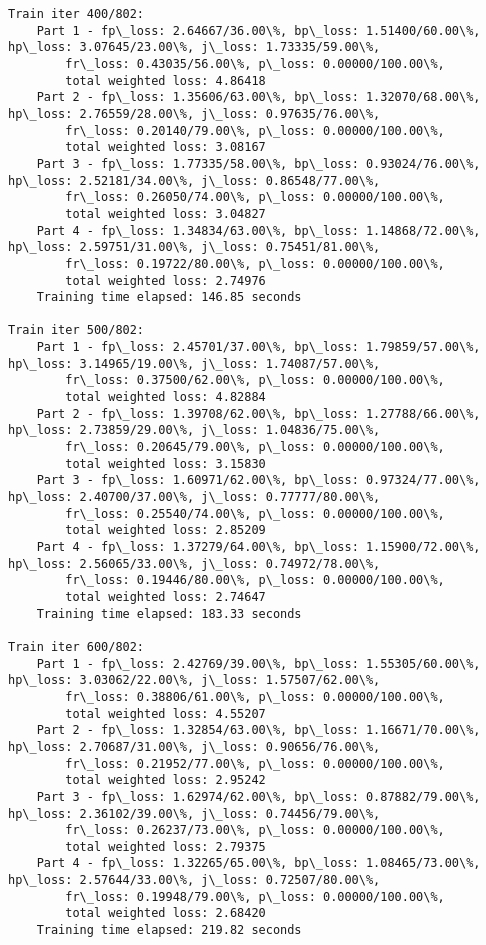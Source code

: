\documentclass[11pt]{article}
\begin{document}
\begin{Verbatim}[commandchars=\\\{\}]
Train iter 400/802:
	Part 1 - fp\_loss: 2.64667/36.00\%, bp\_loss: 1.51400/60.00\%, hp\_loss: 3.07645/23.00\%, j\_loss: 1.73335/59.00\%, 
		fr\_loss: 0.43035/56.00\%, p\_loss: 0.00000/100.00\%, 
		total weighted loss: 4.86418
	Part 2 - fp\_loss: 1.35606/63.00\%, bp\_loss: 1.32070/68.00\%, hp\_loss: 2.76559/28.00\%, j\_loss: 0.97635/76.00\%, 
		fr\_loss: 0.20140/79.00\%, p\_loss: 0.00000/100.00\%, 
		total weighted loss: 3.08167
	Part 3 - fp\_loss: 1.77335/58.00\%, bp\_loss: 0.93024/76.00\%, hp\_loss: 2.52181/34.00\%, j\_loss: 0.86548/77.00\%, 
		fr\_loss: 0.26050/74.00\%, p\_loss: 0.00000/100.00\%, 
		total weighted loss: 3.04827
	Part 4 - fp\_loss: 1.34834/63.00\%, bp\_loss: 1.14868/72.00\%, hp\_loss: 2.59751/31.00\%, j\_loss: 0.75451/81.00\%, 
		fr\_loss: 0.19722/80.00\%, p\_loss: 0.00000/100.00\%, 
		total weighted loss: 2.74976
	Training time elapsed: 146.85 seconds

Train iter 500/802:
	Part 1 - fp\_loss: 2.45701/37.00\%, bp\_loss: 1.79859/57.00\%, hp\_loss: 3.14965/19.00\%, j\_loss: 1.74087/57.00\%, 
		fr\_loss: 0.37500/62.00\%, p\_loss: 0.00000/100.00\%, 
		total weighted loss: 4.82884
	Part 2 - fp\_loss: 1.39708/62.00\%, bp\_loss: 1.27788/66.00\%, hp\_loss: 2.73859/29.00\%, j\_loss: 1.04836/75.00\%, 
		fr\_loss: 0.20645/79.00\%, p\_loss: 0.00000/100.00\%, 
		total weighted loss: 3.15830
	Part 3 - fp\_loss: 1.60971/62.00\%, bp\_loss: 0.97324/77.00\%, hp\_loss: 2.40700/37.00\%, j\_loss: 0.77777/80.00\%, 
		fr\_loss: 0.25540/74.00\%, p\_loss: 0.00000/100.00\%, 
		total weighted loss: 2.85209
	Part 4 - fp\_loss: 1.37279/64.00\%, bp\_loss: 1.15900/72.00\%, hp\_loss: 2.56065/33.00\%, j\_loss: 0.74972/78.00\%, 
		fr\_loss: 0.19446/80.00\%, p\_loss: 0.00000/100.00\%, 
		total weighted loss: 2.74647
	Training time elapsed: 183.33 seconds

Train iter 600/802:
	Part 1 - fp\_loss: 2.42769/39.00\%, bp\_loss: 1.55305/60.00\%, hp\_loss: 3.03062/22.00\%, j\_loss: 1.57507/62.00\%, 
		fr\_loss: 0.38806/61.00\%, p\_loss: 0.00000/100.00\%, 
		total weighted loss: 4.55207
	Part 2 - fp\_loss: 1.32854/63.00\%, bp\_loss: 1.16671/70.00\%, hp\_loss: 2.70687/31.00\%, j\_loss: 0.90656/76.00\%, 
		fr\_loss: 0.21952/77.00\%, p\_loss: 0.00000/100.00\%, 
		total weighted loss: 2.95242
	Part 3 - fp\_loss: 1.62974/62.00\%, bp\_loss: 0.87882/79.00\%, hp\_loss: 2.36102/39.00\%, j\_loss: 0.74456/79.00\%, 
		fr\_loss: 0.26237/73.00\%, p\_loss: 0.00000/100.00\%, 
		total weighted loss: 2.79375
	Part 4 - fp\_loss: 1.32265/65.00\%, bp\_loss: 1.08465/73.00\%, hp\_loss: 2.57644/33.00\%, j\_loss: 0.72507/80.00\%, 
		fr\_loss: 0.19948/79.00\%, p\_loss: 0.00000/100.00\%, 
		total weighted loss: 2.68420
	Training time elapsed: 219.82 seconds


\end{Verbatim}
\end{document}
